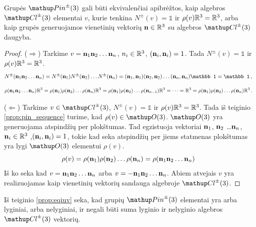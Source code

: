 \begin{proposition}
	\label{prop:eqiuv}
	Grupės $\pinpm$ gali būti ekvivalenčiai apibrėžtos,
	kaip algebros $\Clpm$ elementai $v$, kurie tenkina $N^\pm(v) = \mathbb1$ ir $\rho(v)\mathbb{R}^3 = \mathbb{R}^3$,
	arba kaip grupės generuojamos vienetinių vektorių $\vb n \in \mathbb{R}^3$ su algebros $\Clpm$ daugyba.
\end{proposition}
\begin{proof}
	($\Rightarrow$) Tarkime $v = \vb n_1 \vb n_2 \dots \vb n_n$,
	$n_i \in \mathbb{R}^3$, $(\vb n_i,\vb n_i)=1$.
	Tada $N^\pm(v) = \mathbb1$ ir $\rho(v)\mathbb{R}^3 = \mathbb{R}^3$.
	\begin{equation}
		\begin{aligned}
			N^\pm(\vb n_1 \vb n_2 \dots \vb n_n) 
			=  
			N^\pm(\vb n_1) N^\pm(\vb n_2) \dots N^\pm(\vb n_n) 
			=
			(\vb n_1,\vb n_1)(\vb n_2,\vb n_2)\dots(\vb n_n,\vb n_n) \mathbb1
			=
			\mathbb1
			\,,
		\end{aligned}
	\end{equation}
	\begin{equation}
		\begin{aligned}
			\rho(\vb n_1 \vb n_2 \dots \vb n_n)\mathbb{R}^3
			=\rho(\vb n_1) \rho(\vb n_2) \dots \rho(\vb n_n)\mathbb{R}^3
			=\rho(\vb n_1) \rho(\vb n_2) \dots \rho(\vb n_{n-1})\mathbb{R}^3
			= \dots 
			= \mathbb{R}^3
			=\rho(\vb n_1) \rho(\vb n_2) \dots \rho(\vb n_n)\mathbb{R}^3
			\,.
		\end{aligned}
	\end{equation}

	($\Leftarrow$) Tarkime $v\in\Clpm$, $N^\pm(v)=\mathbb1$ ir $\rho(v)\mathbb{R}^3 = \mathbb{R}^3$.
	Tada iš teiginio \ref{prop:pin_sequence} turime, kad $\rho(v) \in \Orth3$.
	$\Orth3$ yra generuojama atspindžių per plokštumas.
	Tad egzistuoja vektoriai $\vb n_1$, $\vb n_2$ \dots $\vb n_n$, $\vb n_i \in \mathbb{R}^3$ ,$(\vb n_i, \vb n_i)=1$,
	tokie kad seka atspindžių per jiems statmenas plokštumas yra lygi $\Orth3$ elementui $\rho(v)$.
	\begin{equation}
		\rho(v) = \rho(\vb n_1) \rho(\vb n_2) \dots \rho(\vb n_n) = \rho(\vb n_1 \vb n_2 \dots \vb n_n)
	\end{equation}
	Iš ko seka kad $v = \vb n_1 \vb n_2 \dots \vb n_n$ arba $v=-\vb n_1 \vb n_2 \dots \vb n_n$.
	Abiem atvejais $v$ yra realizuojamas kaip vienetinių vektorių sandauga algebroje $\Clpm$.
\end{proof}

\begin{corollary}
	Iš teiginio \ref{prop:eqiuv} seka, kad grupių $\pinpm$ elementai yra arba lyginiai, arba nelyginiai,
	ir negali būti suma lyginio ir nelyginio algebros $\Clpm$ vektorių.
\end{corollary}


